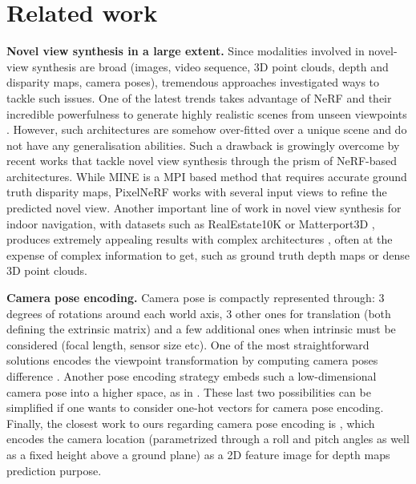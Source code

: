 \section{Related work}

\noindent\textbf{Novel view synthesis in a large extent.} Since modalities involved in novel-view synthesis are broad (images, video sequence, 3D point clouds, depth and disparity maps, camera poses), tremendous approaches investigated ways to tackle such issues. One of the latest trends takes advantage of \ac{NeRF} \citep{mildenhall2020nerf} and their incredible powerfulness to generate highly realistic scenes from unseen viewpoints \citep{wang2021neus,niemeyer2022regnerf,barron2022mip}. However, such architectures are somehow over-fitted over a unique scene and do not have any generalisation abilities. Such a drawback is growingly overcome by recent works \citep{yu2021pixelnerf,li2021mine} that tackle novel view synthesis through the prism of NeRF-based architectures. While MINE \citep{li2021mine} is a \ac{MPI} based method that requires accurate ground truth disparity maps, PixelNeRF \citep{yu2021pixelnerf} works with several input views to refine the predicted novel view. Another important line of work in novel view synthesis for indoor navigation, with datasets such as RealEstate10K \citep{zhou2018stereo} or Matterport3D \citep{zhao2021camera}, produces extremely appealing results with complex architectures \citep{wiles2020synsin,rombach2021geometry,rockwell2021pixelsynth}, often at the expense of complex information to get, such as ground truth depth maps or dense 3D point clouds. \newline

\noindent\textbf{Camera pose encoding.} Camera pose is compactly represented through: 3 degrees of rotations around each world axis, 3 other ones for translation (both defining the extrinsic matrix) and a few additional ones when intrinsic must be considered (focal length, sensor size etc). One of the most straightforward solutions encodes the viewpoint transformation by computing camera poses difference \citep{sun2018multiview}. Another pose encoding strategy embeds such a low-dimensional camera pose into a higher space, as in \citep{kim2020novel,rombach2021geometry}. These last two possibilities can be simplified if one wants to consider one-hot vectors for camera pose encoding. Finally, the closest work to ours regarding camera pose encoding is \citep{zhao2021camera}, which encodes the camera location (parametrized through a roll and pitch angles as well as a fixed height above a ground plane) as a 2D feature image for depth maps prediction purpose. \newline

